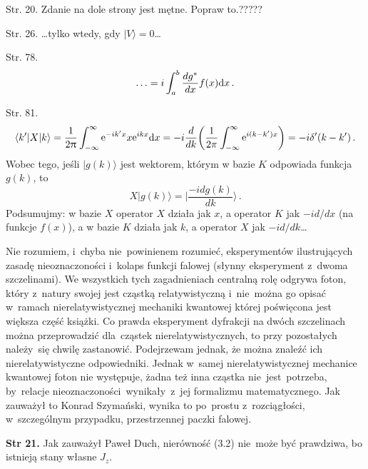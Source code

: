 \documentclass[a4paper,11pt]{article}
\begin{document}
 Str. 20. Zdanie na dole strony jest mętne. Popraw to.?????

 Str. 26. \ldots tylko wtedy, gdy $| V \rangle = 0$\ldots

 Str. 78.
  $$\ldots = i \int_{a}^{b} \frac{ dg^{ * } }{ dx } f( x ) \mathrm{d} x \, .$$

  Str. 81.
    $$\langle k' | X | k \rangle = \frac{ 1 }{ 2 \uppi } \int_{
    -\infty }^{ \infty } \mathrm{e}^{ -i k' x } x \mathrm{e}^{ i k x } \mathrm{d} x =
    -i \frac{ d }{ dk } \bigg( \frac{ 1 }{ 2 \pi } \int_{ -\infty
  }^{ \infty } \mathrm{e}^{ i ( k - k' ) x } \bigg) = -i \delta'( k - k'
    ) \, .$$
  Wobec tego, jeśli $| g( k ) \rangle$ jest wektorem, którym w bazie
  $K$ odpowiada funkcja $g( k )$, to
$$X| g( k ) \rangle = \bigg| \frac{ -i d g( k ) }{ dk } \bigg\rangle \, .$$
Podsumujmy: w bazie $X$ operator $X$ działa jak $x$, a operator $K$
jak $-i d / dx$ (na funkcje $f( x )$), a w bazie $K$ działa jak
$k$, a operator $X$ jak $-i d / dk$\ldots














Nie rozumiem, i~chyba nie~powinienem rozumieć, eksperymentów
  ilustrujących zasadę nieoznaczoności i~kolaps funkcji falowej
  (słynny eksperyment z~dwoma szczelinami). We wszystkich tych
  zagadnieniach centralną rolę odgrywa foton, który z~natury swojej
  jest cząstką relatywistyczną i~nie~można go opisać w~ramach
  nierelatywistycznej mechaniki kwantowej której poświęcona jest
  większa część książki. Co prawda eksperyment dyfrakcji na dwóch
  szczelinach można przeprowadzić dla~cząstek nierelatywistycznych, to
  przy pozostałych należy~się chwilę zastanowić. Podejrzewam jednak,
  że można znaleźć ich nierelatywistyczne odpowiedniki. Jednak w~samej
  nierelatywistycznej mechanice kwantowej foton nie występuje, żadna
  też inna cząstka nie~jest~potrzeba, by~relacje
  nieoznaczoności~wynikały~z~jej formalizmu matematycznego. Jak
  zauważył to Konrad Szymański, wynika to po~prostu z~rozciągłości,
  w~szczególnym przypadku, przestrzennej paczki falowej.

  \textbf{Str 21.} Jak zauważył Paweł Duch, nierówność (3.2)
  nie~może być prawdziwa, bo istnieją stany własne $J_{ z }$.
\end{document}
